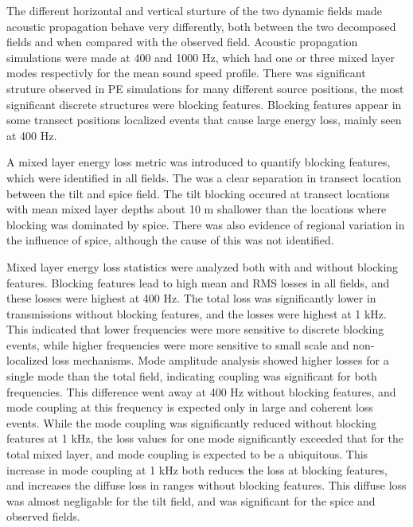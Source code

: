 \documentclass[preprint,NumberedRefs]{JASA}
\begin{document}
The different horizontal and vertical sturture of the two dynamic fields made acoustic propagation behave very differently, both between the two decomposed fields and when compared with the observed field. Acoustic propagation simulations were made at 400 and 1000 Hz, which had one or three mixed layer modes respectivly for the mean sound speed profile. There was significant struture observed in PE simulations for many different source positions, the most significant discrete structures were blocking features. Blocking features appear in some transect positions localized events that cause large energy loss, mainly seen at 400 Hz.

A mixed layer energy loss metric was introduced to quantify blocking features, which were identified in all fields. The was a clear separation in transect location between the tilt and spice field. The tilt blocking occured at transect locations with mean mixed layer depths about 10 m shallower than the locations where blocking was dominated by spice. There was also evidence of regional variation in the influence of spice, although the cause of this was not identified.

Mixed layer energy loss statistics were analyzed both with and without blocking features. Blocking features lead to high mean and RMS losses in all fields, and these losses were highest at 400 Hz. The total loss was significantly lower in transmissions without blocking features, and the losses were highest at 1 kHz. This indicated that lower frequencies were more sensitive to discrete blocking events, while higher frequencies were more sensitive to small scale and non-localized loss mechanisms. Mode amplitude analysis showed higher losses for a single mode than the total field, indicating coupling was significant for both frequencies. This difference went away at 400 Hz without blocking features, and mode coupling at this frequency is expected only in large and coherent loss events. While the mode coupling was significantly reduced without blocking features at 1 kHz, the loss values for one mode significantly exceeded that for the total mixed layer, and mode coupling is expected to be a ubiquitous. This increase in mode coupling at 1 kHz both reduces the loss at blocking features, and increases the diffuse loss in ranges without blocking features. This diffuse loss was almost negligable for the tilt field, and was significant for the spice and observed fields.



\end{document}
